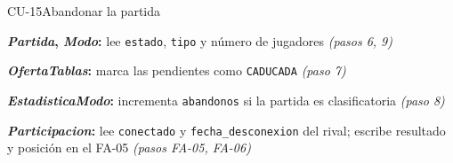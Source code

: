 \begin{fichacu}{CU-15}{Abandonar la partida}
{\begin{cudatos}
      \item \textbf{\textit{Partida}, \textit{Modo}:} lee \texttt{estado}, \texttt{tipo} y número de jugadores \textit{(pasos 6, 9)}
      \item \textbf{\textit{OfertaTablas}:} marca las pendientes como \texttt{CADUCADA} \textit{(paso 7)}
      \item \textbf{\textit{EstadisticaModo}:} incrementa \texttt{abandonos} si la partida es clasificatoria \textit{(paso 8)}
      \item \textbf{\textit{Participacion}:} lee \texttt{conectado} y \texttt{fecha\_\allowbreak{}desconexion} del rival; escribe resultado y posición en el \mbox{FA-05} \textit{(pasos \mbox{FA-05}, \mbox{FA-06})}
    \end{cudatos}} \\ \hline
\end{fichacu}
\clearpage
